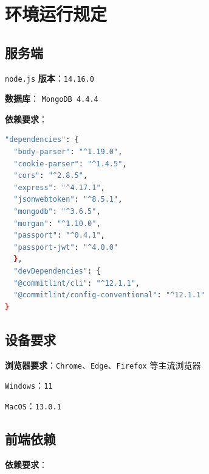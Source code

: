 \documentclass[12pt,a4paper,UTF8]{article}
\begin{document}
\section{环境运行规定}

\subsection{服务端}

\verb|node.js| \textbf{版本}：\verb|14.16.0|

\textbf{数据库}： \verb|MongoDB 4.4.4|

\textbf{依赖要求}： 

\vspace{0.25cm} %

\begin{lstlisting}[language=bash]
"dependencies": { 
  "body-parser": "^1.19.0", 
  "cookie-parser": "^1.4.5", 
  "cors": "^2.8.5", 
  "express": "^4.17.1", 
  "jsonwebtoken": "^8.5.1", 
  "mongodb": "^3.6.5", 
  "morgan": "^1.10.0", 
  "passport": "^0.4.1", 
  "passport-jwt": "^4.0.0" 
  }, 
  "devDependencies": { 
  "@commitlint/cli": "^12.1.1", 
  "@commitlint/config-conventional": "^12.1.1" 
} 
\end{lstlisting}

\subsection{设备要求}

\textbf{浏览器要求}：\verb|Chrome|、\verb|Edge|、\verb|Firefox| 等主流浏览器

\verb|Windows|：\verb|11|

\verb|MacOS|：\verb|13.0.1|

\subsection{前端依赖}

\textbf{依赖要求}：
\end{document}

